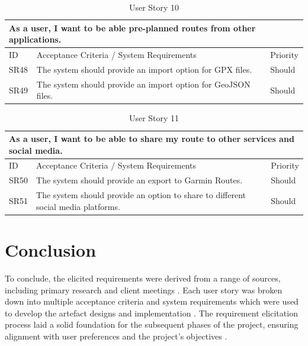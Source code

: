 \begin{table}[!htb]
  \caption{User Story 10}
  \label{tab:user-story-10}
  \begin{tabular}{ m{1cm} m{11cm} m{1cm} }
  \hline
  \multicolumn{3}{p{13cm}}{As a user, I want to be able pre-planned routes from other applications.}\\ 
  \hline
  ID & Acceptance Criteria / System Requirements & Priority\\
  \hline
  \label{SR:48}SR48 & The system should provide an import option for GPX files. & Should\\
  \label{SR:49}SR49 & The system should provide an import option for GeoJSON files. & Should\\
  \hline
  \end{tabular}
\end{table}

\begin{table}[!htb]
  \caption{User Story 11}
  \label{tab:user-story-11}
  \begin{tabular}{ m{1cm} m{11cm} m{1cm} }
  \hline
  \multicolumn{3}{p{13cm}}{As a user, I want to be able to share my route to other services and social media.}\\ 
  \hline
  ID & Acceptance Criteria / System Requirements & Priority\\
  \hline
  \label{SR:50}SR50 & The system should provide an export to Garmin Routes. & Should\\
  \label{SR:51}SR51 & The system should provide an option to share to different social media platforms. & Should\\
  \hline
  \end{tabular}
\end{table}

\clearpage
\section{Conclusion}
\label{requirements:conclusion}

To conclude, the elicited requirements were derived from a range of sources, including primary research  and client meetings . Each user story was broken down into multiple acceptance criteria and system requirements which were used to develop the artefact designs  and implementation . The requirement elicitation process laid a solid foundation for the subsequent phases of the project, ensuring alignment with user preferences  and the project's objectives . 